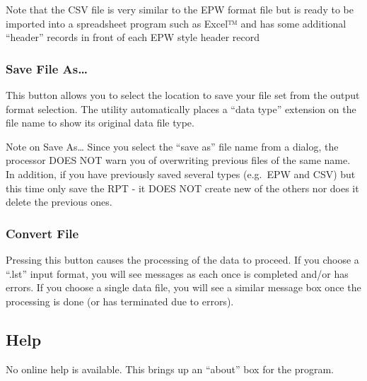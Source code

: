 Note that the CSV file is very similar to the EPW format file but is ready to be imported into a spreadsheet program such as Excel™ and has some additional ``header'' records in front of each EPW style header record

\subsubsection{Save File As\ldots{}}\label{save-file-as}

This button allows you to select the location to save your file set from the output format selection. The utility automatically places a ``data type'' extension on the file name to show its original data file type.

Note on Save As\ldots{} Since you select the ``save as'' file name from a dialog, the processor DOES NOT warn you of overwriting previous files of the same name. In addition, if you have previously saved several types (e.g.~EPW and CSV) but this time only save the RPT - it DOES NOT create new of the others nor does it delete the previous ones.

\subsubsection{Convert File}\label{convert-file}

Pressing this button causes the processing of the data to proceed. If you choose a ``.lst'' input format, you will see messages as each once is completed and/or has errors. If you choose a single data file, you will see a similar message box once the processing is done (or has terminated due to errors).

\subsection{Help}\label{help}

No online help is available. This brings up an ``about'' box for the program.
